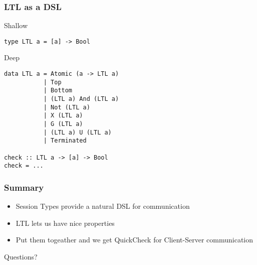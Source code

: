 \documentclass{beamer}
\begin{document}
\begin{frame}[fragile]
    \frametitle{LTL as a DSL}
    \centering
    Shallow
    \begin{verbatim}
type LTL a = [a] -> Bool
    \end{verbatim}
    \pause
    \centering
    Deep
    \begin{verbatim}
data LTL a = Atomic (a -> LTL a)
           | Top 
           | Bottom
           | (LTL a) And (LTL a)
           | Not (LTL a)
           | X (LTL a)
           | G (LTL a)
           | (LTL a) U (LTL a)
           | Terminated

check :: LTL a -> [a] -> Bool
check = ...
    \end{verbatim}
\end{frame}

\begin{frame}
    \frametitle{Summary}
    \begin{itemize}
        \item Session Types provide a natural DSL for communication
        \item LTL lets us have nice properties
        \item Put them togeather and we get QuickCheck for Client-Server communication
    \end{itemize}
\end{frame}

\begin{frame}
    \Huge{\centerline{Questions?}}
\end{frame}
\end{document}

